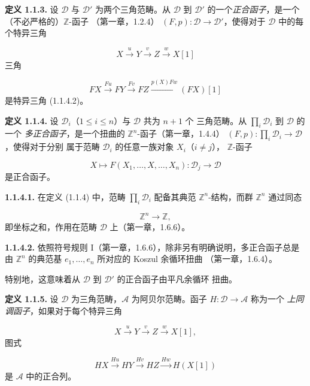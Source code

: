 \clearpage
{}%
\begingroup
\small
\setlength{\abovedisplayskip}{4pt plus 2pt minus 2pt}%
\setlength{\belowdisplayskip}{4pt plus 2pt minus 2pt}%

\noindent\textbf{定义 1.1.3.}\quad
设 $\mathcal D$ 与 $\mathcal D'$ 为两个三角范畴。从 $\mathcal D$ 到
$\mathcal D'$ 的一个\emph{正合函子}，是一个（不必严格的）$\mathbb Z$-函子
（第一章，1.2.4）
$(F,p)\colon\mathcal D\longrightarrow\mathcal D'$，使得对于
$\mathcal D$ 中的每个特异三角

\[
  X\xrightarrow{u}Y\xrightarrow{v}Z\xrightarrow{w}X[1]
\]
三角

\[
  FX\xrightarrow{Fu}FY\xrightarrow{Fv}FZ
  \xrightarrow{p(X)Fw}(FX)[1]
\]
是特异三角 (1.1.4.2)。

\medskip
\noindent\textbf{定义 1.1.4.}\quad
设 $\mathcal D_i$（$1\leq i\leq n$）与 $\mathcal D$ 共为 $n+1$ 个
三角范畴。从 $\prod_i\mathcal D_i$ 到 $\mathcal D$ 的一个
\emph{多正合函子}，是一个扭曲的 $\mathbb Z^n$-函子（第一章，1.4.4）
$(F,p)\colon\prod_i\mathcal D_i\longrightarrow\mathcal D$，使得对于分别
属于范畴 $\mathcal D_i$ 的任意一族对象 $X_i$（$i\ne j$），
$\mathbb Z$-函子

\[
  X\longmapsto F(X_1,\ldots,X,\ldots,X_n)\colon
  \mathcal D_j\longrightarrow\mathcal D
\]
是正合函子。

\medskip
\noindent\textbf{1.1.4.1.}\quad
在定义 (1.1.4) 中，范畴 $\prod_i\mathcal D_i$ 配备其典范
$\mathbb Z^n$-结构，而群 $\mathbb Z^n$ 通过同态

\[
  \mathbb Z^n\longrightarrow\mathbb Z,
\]
即坐标之和，作用在范畴 $\mathcal D$ 上（第一章，1.6.6）。

\medskip
\noindent\textbf{1.1.4.2.}\quad
依照符号规则 I（第一章，1.6.6），除非另有明确说明，多正合函子总是由
$\mathbb Z^n$ 的典范基 $e_1,\ldots,e_n$ 所对应的 Koszul 余循环扭曲
（第一章，1.6.4）。

特别地，这意味着从 $\mathcal D$ 到 $\mathcal D'$ 的正合函子由平凡余循环
扭曲。

\medskip
\noindent\textbf{定义 1.1.5.}\quad
设 $\mathcal D$ 为三角范畴，$\mathcal A$ 为阿贝尔范畴。函子
$H\colon\mathcal D\longrightarrow\mathcal A$ 称为一个
\emph{上同调函子}，如果对于每个特异三角

\[
  X\xrightarrow{u}Y\xrightarrow{v}Z\xrightarrow{w}X[1],
\]
图式

\[
  HX\xrightarrow{Hu}HY\xrightarrow{Hv}HZ\xrightarrow{Hw}H(X[1])
\]
是 $\mathcal A$ 中的正合列。
\endgroup

